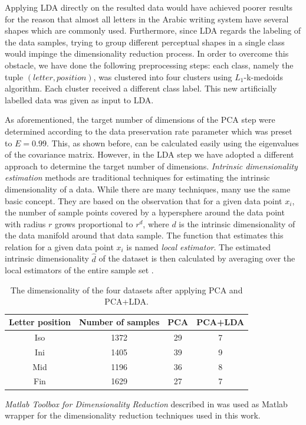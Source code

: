 \iftoggle{edit-mode}{\hspace{0pt}\marginpar{Implementation: Clustering and LDA}}{}
Applying LDA directly on the resulted data would have achieved poorer results for the reason that almost all letters in the Arabic writing system have several shapes which are commonly used. Furthermore, since LDA regards the labeling of the data samples, trying to group different perceptual shapes in a single class would impinge the dimensionality reduction process. 
In order to overcome this obstacle, we have done the following preprocessing steps: each class, namely the tuple $(letter, position)$, was clustered into four clusters using $L_1$-k-medoids algorithm. Each cluster received a different class label. This new artificially labelled data was given as input to LDA.

\iftoggle{edit-mode}{\hspace{0pt}\marginpar{LDA target dimensionality}}{}
As aforementioned, the target number of dimensions of the PCA step were determined according to the data preservation rate parameter which was preset to $E=0.99$. This, as shown before, can be calculated easily using the eigenvalues of the covariance matrix. However, in the LDA step we have adopted a different approach to determine the target number of dimensions. \emph{Intrinsic dimensionality estimation} methods are traditional techniques for estimating the intrinsic dimensionality of a data. While there are many techniques, many use the same basic concept. They are based on the observation that for a given data point $x_i$, the number of sample points covered by a hypersphere around the data point with radius $r$ grows proportional to $r^d$, where $d$ is the intrinsic dimensionality of the data manifold around that data sample.  
The function that estimates this relation for a given data point $x_i$ is named \emph{local estimator}.
The estimated intrinsic dimensionality $\hat{d}$ of the dataset is then calculated by averaging over the local estimators of the entire sample set \cite{van2007introduction}.

\begin{table}
\centering
\begin{tabular}{ | c | c | c | c |}
\hline
Letter position & Number of samples & PCA & PCA+LDA\\
\hline                 
  Iso & 1372 & 29 & 7 \\ 
  \hline
  Ini & 1405 & 39 & 9 \\ 
  \hline
  Mid & 1196 & 36 & 8 \\ 
  \hline
  Fin & 1629 & 27 & 7 \\ 
  \hline
\end{tabular}
\caption{The dimensionality of the four datasets after applying PCA and PCA+LDA.}
\label{table:dr_dimensions_results} 
\end{table}

\iftoggle{edit-mode}{\hspace{0pt}\marginpar{The DR package}}{}
\emph{Matlab Toolbox for Dimensionality Reduction} described in \cite{van2007introduction} was used as Matlab wrapper for the dimensionality reduction techniques used in this work.

  
%
%
%
